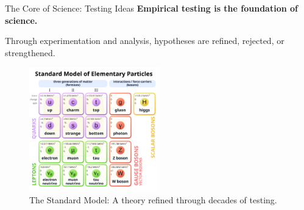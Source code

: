 \begin{frame}{The Core of Science: Testing Ideas}
	\textbf{Empirical testing is the foundation of science.}

	Through experimentation and analysis, hypotheses are refined, rejected, or strengthened.
	\vspace{-0.2cm}
	\begin{figure}
		\includegraphics[width=0.5\textwidth]{Figures/Standard-Model.png}
		\vspace{-0.5cm}
		\caption{The Standard Model: A theory refined through decades of testing. \cite{Cush2019}}
	\end{figure}

\end{frame}
